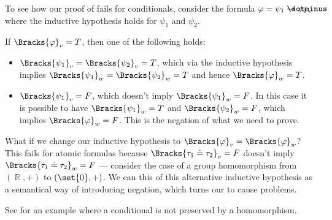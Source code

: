 \begin{example}\label{ex:thm:positive_formulas_preserved_under_homomorphism/proof_failure}
  To see how our proof of  fails for conditionals, consider the formula \( \varphi = \psi_1 \synimplies \psi_2 \), where the inductive hypothesis holds for \( \psi_1 \) and \( \psi_2 \).

  If \( \Bracks{\varphi}_v = T \), then one of the following holds:
  \begin{itemize}
    \item \( \Bracks{\psi_1}_v = \Bracks{\psi_2}_v = T \), which via the inductive hypothesis implies \( \Bracks{\psi_1}_w = \Bracks{\psi_2}_w = T \) and hence \( \Bracks{\varphi}_w = T \).
    \item \( \Bracks{\psi_1}_v = F \), which doesn't imply \( \Bracks{\psi_1}_w = F \). In this case it is possible to have \( \Bracks{\psi_1}_w = T \) and \( \Bracks{\psi_2}_w = F \), which implies \( \Bracks{\varphi}_w = F \). This is the negation of what we need to prove.
  \end{itemize}

  What if we change our inductive hypothesis to \( \Bracks{\varphi}_v = \Bracks{\varphi}_w \)? This fails for atomic formulas because \( \Bracks{\tau_1 \syneq \tau_2}_v = F \) doesn't imply \( \Bracks{\tau_1 \syneq \tau_2}_w = F \) --- consider the case of a group homomorphism from \( (\BbbR, +) \) to \( (\set{ 0 }, +) \). We can this of this alternative inductive hypothesis as a semantical way of introducing negation, which turns our to cause problems.

  See  for an example where a conditional is not preserved by a homomorphism.
\end{example}

